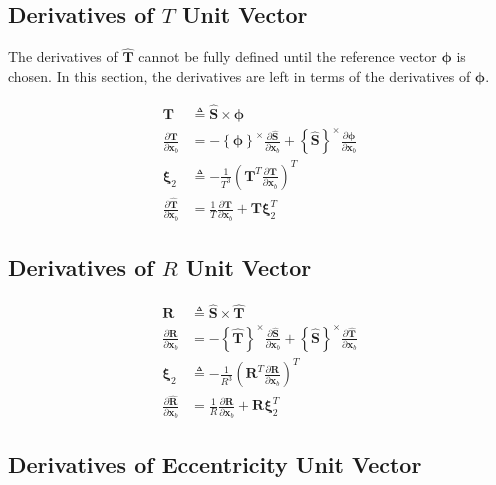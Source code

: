 \documentclass[]{article}
\newcommand{\vb}[1]{\bm{#1}} %
\newcommand{\vbh}[1]{\hat{\bm{#1}}} %
\newcommand{\pd}[2]{\frac{\partial #1}{\partial #2}} %
\newcommand{\crossmat}[1]{\left\{ {#1} \right\}^{\times}} %
\newcommand{\xb}[0]{\vb{x}_b}
\begin{document}
\subsection{Derivatives of $T$ Unit Vector}

The derivatives of $\vbh{T}$ cannot be fully defined until the reference vector $\vb{\phi}$ is chosen. In this section, the derivatives are left in terms of the derivatives of $\vb{\phi}$.

\begin{align}
	\vb{T} &\triangleq \vbh{S} \times \vb{\phi} \\
	\pd{\vb{T}}{\xb} &= -\crossmat{\vb{\phi}} \pd{\vbh{S}}{\xb} + \crossmat{\vbh{S}} \pd{\vb{\phi}}{\xb} \\
	\vb{\xi}_2 &\triangleq -\frac{1}{T^3} \left( \vb{T}^T \pd{\vb{T}}{\xb} \right)^T \\
	\pd{\vbh{T}}{\xb} &= \frac{1}{T} \pd{\vb{T}}{\xb} + \vb{T} \vb{\xi}_2^T
\end{align}

\subsection{Derivatives of $R$ Unit Vector}

\begin{align}
	\vb{R} &\triangleq \vbh{S} \times \vbh{T} \\
	\pd{\vb{R}}{\xb} &= -\crossmat{\vbh{T}} \pd{\vbh{S}}{\xb} + \crossmat{\vbh{S}} \pd{\vbh{T}}{\xb} \\
	\vb{\xi}_2 &\triangleq -\frac{1}{R^3} \left( \vb{R}^T \pd{\vb{R}}{\xb} \right)^T \\
	\pd{\vbh{R}}{\xb} &= \frac{1}{R} \pd{\vb{R}}{\xb} + \vb{R} \vb{\xi}_2^T
\end{align}

\subsection{Derivatives of Eccentricity Unit Vector}
\end{document}
